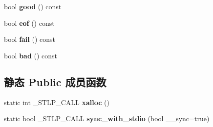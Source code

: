 \begin{DoxyCompactItemize}
\mbox{\label{classios__base_ad8695dc14ae96d2f22a33ed8e8c7bf97}} 
bool {\bfseries good} () const
\item 
\mbox{\label{classios__base_ab2233448026130a3fa0fa28d86092685}} 
bool {\bfseries eof} () const
\item 
\mbox{\label{classios__base_a51d93feb5de438a5c431a40f33e5772f}} 
bool {\bfseries fail} () const
\item 
\mbox{\label{classios__base_ad208dbe362b210f031a2fd0c5aa3142b}} 
bool {\bfseries bad} () const
\end{DoxyCompactItemize}
\subsection*{静态 Public 成员函数}
\begin{DoxyCompactItemize}
\item 
\mbox{\label{classios__base_ae45687ccc9c866da48414c79ef207ee2}} 
static int \+\_\+\+S\+T\+L\+P\+\_\+\+C\+A\+LL {\bfseries xalloc} ()
\item 
\mbox{\label{classios__base_a6af846709e963e4327e0336ce95a75b4}} 
static bool \+\_\+\+S\+T\+L\+P\+\_\+\+C\+A\+LL {\bfseries sync\+\_\+with\+\_\+stdio} (bool \+\_\+\+\_\+sync=true)
\end{DoxyCompactItemize}

